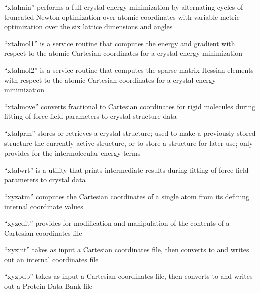 \documentclass[letterpaper,11pt,english]{sphinxmanual}
\begin{document}
“xtalmin” performs a full crystal energy minimization by alternating cycles of truncated Newton optimization over atomic coordinates with variable metric optimization over the six lattice dimensions and angles


“xtalmol1” is a service routine that computes the energy and gradient with respect to the atomic Cartesian coordinates for a crystal energy minimization


“xtalmol2” is a service routine that computes the sparse matrix Hessian elements with respect to the atomic Cartesian coordinates for a crystal energy minimization


“xtalmove” converts fractional to Cartesian coordinates for rigid molecules during fitting of force field parameters to crystal structure data


“xtalprm” stores or retrieves a crystal structure; used to make a previously stored structure the currently active structure, or to store a structure for later use; only provides for the intermolecular energy terms


“xtalwrt” is a utility that prints intermediate results during fitting of force field parameters to crystal data


“xyzatm” computes the Cartesian coordinates of a single atom from its defining internal coordinate values


“xyzedit” provides for modification and manipulation of the contents of a Cartesian coordinates file


“xyzint” takes as input a Cartesian coordinates file, then converts to and writes out an internal coordinates file


“xyzpdb” takes as input a Cartesian coordinates file, then converts to and writes out a Protein Data Bank file

\end{document}
